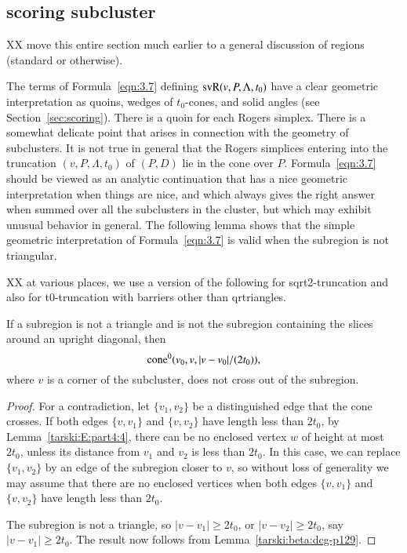 \subsection{scoring subcluster} %

XX move this entire section much earlier to a general discussion
of regions (standard or otherwise).

The terms of Formula~\ref{eqn:3.7} defining
${\operatorname{svR}}(v,P,\Lambda,t_0)$ have a clear geometric
interpretation as quoins, wedges of $t_0$-cones, and solid angles
(see Section~\ref{sec:scoring}). There is a quoin for each Rogers
simplex. There is a somewhat delicate point that arises in
connection with the geometry of subclusters.  It is not true in
general that the Rogers simplices entering into the truncation
$(v,P,\Lambda,t_0)$ of $(P,D)$ lie in the cone over $P$.
Formula~\ref{eqn:3.7} should be viewed as an analytic continuation
that has a nice geometric interpretation when things are nice, and
which always gives the right answer when summed over all the
subclusters in the cluster, but which may exhibit unusual behavior
in general. The following lemma shows that the simple geometric
interpretation of Formula~\ref{eqn:3.7} is valid when the
subregion is not triangular.

XX at various places, we use a version of the following 
for sqrt2-truncation
and also for t0-truncation with barriers other than qrtriangles.


\begin{lemma}
    \label{lemma:no-cross}
If a subregion is not a triangle and is not  the subregion
containing the slices around an upright diagonal, then
   $${\operatorname{cone}}^0(v_0,v,|v-v_0|/(2t_0)),$$
where $v$ is a corner of the subcluster,
does not cross out of the subregion.
\end{lemma}

\begin{proof}
For a contradiction, let $\{v_1,v_2\}$ be a distinguished edge that
the cone crosses. If both edges $\{v,v_1\}$ and $\{v,v_2\}$ have
length less than $2t_0$, by Lemma~\ref{tarski:E:part4:4},
there can be no enclosed vertex $w$ of
height at most $2t_0$, unless its distance from $v_1$ and $v_2$ is
less than $2t_0$.
In this case, we can replace $\{v_1,v_2\}$ by an edge of the
subregion closer to $v$, so without loss of generality we may
assume that there are no enclosed vertices when both edges
$\{v,v_1\}$ and $\{v,v_2\}$ have length less than $2t_0$.

The subregion is not a triangle, so $|v-v_1|\ge 2t_0$, or
$|v-v_2|\ge 2t_0$, say $|v-v_1|\ge 2t_0$.  The result now follows
from Lemma~\ref{tarski:beta:dcg-p129}.
\end{proof}

